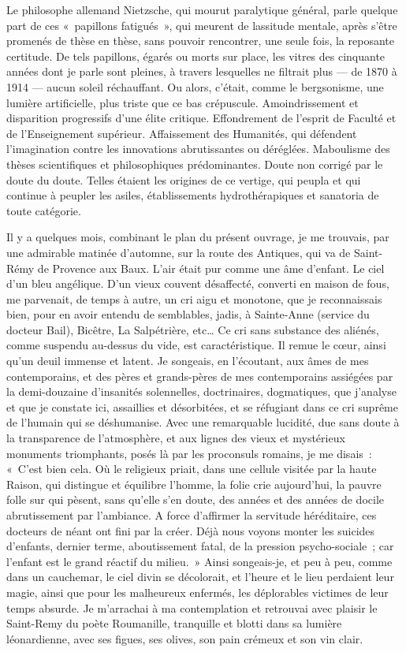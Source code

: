 \documentclass[french,twoside]{book} %
\begin{document}
Le philosophe allemand Nietzsche, qui mourut paralytique général, parle quelque part de ces « papillons fatigués », qui meurent de lassitude mentale, après s’être promenés de thèse en thèse, sans pouvoir rencontrer, une seule fois, la reposante certitude. De tels papillons, égarés ou morts sur place, les vitres des cinquante années dont je parle sont pleines, à travers lesquelles ne filtrait plus — de 1870 à 1914 — aucun soleil réchauffant. Ou alors, c’était, comme le bergsonisme, une lumière artificielle, plus triste que ce bas crépuscule. Amoindrissement et disparition progressifs d’une élite critique. Effondrement de l’esprit de Faculté et de l’Enseignement supérieur. Affaissement des Humanités, qui défendent l’imagination contre les innovations abrutissantes ou déréglées. Maboulisme des thèses scientifiques et philosophiques prédominantes. Doute non corrigé par le doute du doute. Telles étaient les origines de ce vertige, qui peupla et qui continue à peupler les asiles, établissements hydrothérapiques et sanatoria de toute catégorie.\par
Il y a quelques mois, combinant le plan du présent ouvrage, je me trouvais, par une admirable matinée d’automne, sur la route des Antiques, qui va de Saint-Rémy de Provence aux Baux. L’air était pur comme une âme d’enfant. Le ciel d’un bleu angélique. D’un vieux couvent désaffecté, converti en maison de fous, me parvenait, de temps à autre, un cri aigu et monotone, que je reconnaissais bien, pour en avoir entendu de semblables, jadis, à Sainte-Anne (service du docteur Bail), Bicêtre, La Salpétrière, etc… Ce cri sans substance des aliénés, comme suspendu au-dessus du vide, est caractéristique. Il remue le cœur, ainsi qu’un deuil immense et latent. Je songeais, en l’écoutant, aux âmes de mes contemporains, et des pères et grands-pères de mes contemporains assiégées par la demi-douzaine d’insanités solennelles, doctrinaires, dogmatiques, que j’analyse et que je constate ici, assaillies et désorbitées, et se réfugiant dans ce cri suprême de l’humain qui se déshumanise. Avec une remarquable lucidité, due sans doute à la transparence de l’atmosphère, et aux lignes des vieux et mystérieux monuments triomphants, posés là par les proconsuls romains, je me disais : « C’est bien cela. Où le religieux priait, dans une cellule visitée par la haute Raison, qui distingue et équilibre l’homme, la folie crie aujourd’hui, la pauvre folle sur qui pèsent, sans qu’elle s’en doute, des années et des années de docile abrutissement par l’ambiance. A force d’affirmer la servitude héréditaire, ces docteurs de néant ont fini par la créer. Déjà nous voyons monter les suicides d’enfants, dernier terme, aboutissement fatal, de la pression psycho-sociale ; car l’enfant est le grand réactif du milieu. » Ainsi songeais-je, et peu à peu, comme dans un cauchemar, le ciel divin se décolorait, et l’heure et le lieu perdaient leur magie, ainsi que pour les malheureux enfermés, les déplorables victimes de leur temps absurde. Je m’arrachai à ma contemplation et retrouvai avec plaisir le Saint-Remy du poète Roumanille, tranquille et blotti dans sa lumière léonardienne, avec ses figues, ses olives, son pain crémeux et son vin clair.\par
\end{document}
